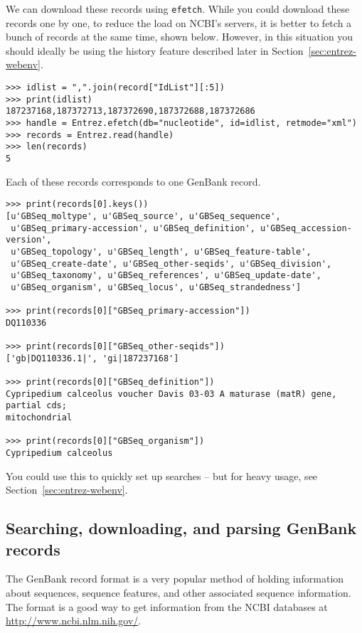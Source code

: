 \documentclass{report}
\begin{document}
\label{sec:entrez-batched-efetch}
We can download these records using \verb+efetch+.
While you could download these records one by one, to reduce the load on NCBI's servers, it is better to fetch a bunch of records at the same time, shown below.
However, in this situation you should ideally be using the history feature described later in Section~\ref{sec:entrez-webenv}.

\begin{verbatim}
>>> idlist = ",".join(record["IdList"][:5])
>>> print(idlist)
187237168,187372713,187372690,187372688,187372686
>>> handle = Entrez.efetch(db="nucleotide", id=idlist, retmode="xml")
>>> records = Entrez.read(handle)
>>> len(records)
5
\end{verbatim}
Each of these records corresponds to one GenBank record.
\begin{verbatim}
>>> print(records[0].keys())
[u'GBSeq_moltype', u'GBSeq_source', u'GBSeq_sequence',
 u'GBSeq_primary-accession', u'GBSeq_definition', u'GBSeq_accession-version',
 u'GBSeq_topology', u'GBSeq_length', u'GBSeq_feature-table',
 u'GBSeq_create-date', u'GBSeq_other-seqids', u'GBSeq_division',
 u'GBSeq_taxonomy', u'GBSeq_references', u'GBSeq_update-date',
 u'GBSeq_organism', u'GBSeq_locus', u'GBSeq_strandedness']

>>> print(records[0]["GBSeq_primary-accession"])
DQ110336

>>> print(records[0]["GBSeq_other-seqids"])
['gb|DQ110336.1|', 'gi|187237168']

>>> print(records[0]["GBSeq_definition"])
Cypripedium calceolus voucher Davis 03-03 A maturase (matR) gene, partial cds;
mitochondrial

>>> print(records[0]["GBSeq_organism"])
Cypripedium calceolus
\end{verbatim}

You could use this to quickly set up searches -- but for heavy usage, see Section~\ref{sec:entrez-webenv}.

\subsection{Searching, downloading, and parsing GenBank records}
\label{sec:entrez-search-fetch-genbank}

The GenBank record format is a very popular method of holding information about sequences, sequence features, and other associated sequence information. The format is a good way to get information from the NCBI databases at \url{http://www.ncbi.nlm.nih.gov/}.
\end{document}
